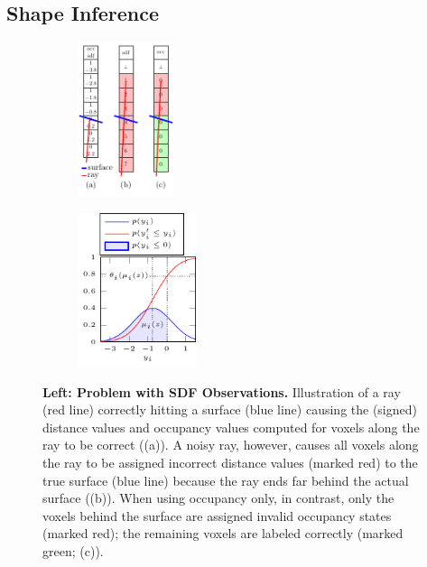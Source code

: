 \subsection{Shape Inference}
\label{subsec:method-inference}

\begin{figure}[t]
    \vspace*{-\figskipabove px}
    \centering
    \hfill
    \begin{subfigure}[t]{0.25\linewidth}
        \vspace{0px}
        \centering
        \includegraphics[height=4.5cm]{fig_method_sdf_2}
    \end{subfigure}
    \begin{subfigure}[t]{0.6\linewidth}
        \vspace{3px}
        \centering
        \hspace*{-12px}
        \includegraphics[height=4.5cm]{fig_method_sdf_1}
    \end{subfigure}
    \hfill
    \vspace*{-8px}
    \caption{{{\bf Left: Problem with SDF Observations.} Illustration of a ray ({\color{red}red line}) correctly hitting a surface ({\color{blue}blue line}) causing the (signed) distance values and occupancy values computed for voxels along the ray to be correct (\cf (a)). A noisy ray, however, causes all voxels along the ray to be assigned incorrect distance values (marked {\colorbox{red!25}{red}}) \wrt to the true surface ({\color{blue}blue line}) because the ray ends far behind the actual surface (\cf (b)). When using occupancy only, in contrast, only the voxels behind the surface are assigned invalid occupancy states (marked {\colorbox{red!25}{red}}); the remaining voxels are labeled correctly (marked {\colorbox{green!25}{green}}; \cf (c)).
}}
\end{figure}
